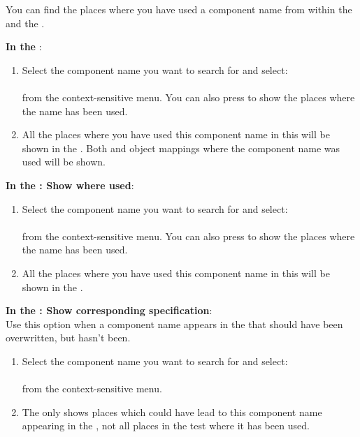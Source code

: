 You can find the places where you have used a component name from within the \gdomeditor{} and the \gdcompnamebrowser{}. 

\textbf{In the \gdcompnamebrowser{}}:
\label{TasksSearchCompNameBrowserShowWhereUsed}
\begin{enumerate}
\item Select the component name you want to search for and select:\\
\\
from the context-sensitive menu. 
You can also press  to show the places where the name has been used.
\item All the places where you have used this component name in this \gdproject{} will be shown in the \gdsearchresultview{} . Both \gdcases{} and object mappings where the component name was used will be shown. 
\end{enumerate}

\textbf{In the \gdomeditor{}: Show where used}:
\begin{enumerate}
\item Select the component name you want to search for and select:\\
\\
from the context-sensitive menu. 
You can also press  to show the places where the name has been used.
\item All the places where you have used this component name in this \gdproject{} will be shown in the \gdsearchresultview{} . 
\end{enumerate}

\textbf{In the \gdomeditor{}: Show corresponding specification}:\\
\label{TasksSearchCompNameCorresponding}
Use this option when a component name appears in the \gdomeditor{} that should have been overwritten, but hasn't been.
\begin{enumerate}
\item Select the component name you want to search for and select:\\
\\
from the context-sensitive menu. 
\item The \gdsearchresultview{} only shows places which could have lead to this component name appearing in the \gdomeditor{}, not all places in the test where it has been used.
\end{enumerate}
